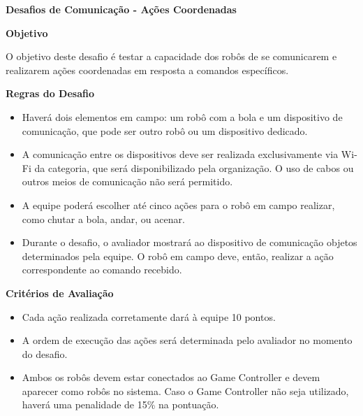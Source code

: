\clearpage
\sffamily
{\bfseries\color[rgb]{0.4,0.4,0.4}Desafios de Comunicação - Ações Coordenadas}
{}

\bigskip

{\bfseries Objetivo}

\headlinebox

O objetivo deste desafio é testar a capacidade dos robôs de se comunicarem e realizarem ações coordenadas em resposta a comandos específicos.

\bigskip

{\bfseries Regras do Desafio}

\headlinebox

\begin{itemize}
	\item Haverá dois elementos em campo: um robô com a bola e um dispositivo de comunicação, que pode ser outro robô ou um dispositivo dedicado.
	\item A comunicação entre os dispositivos deve ser realizada exclusivamente via Wi-Fi da categoria, que será disponibilizado pela organização. O uso de cabos ou outros meios de comunicação não será permitido.
	\item A equipe poderá escolher até cinco ações para o robô em campo realizar, como chutar a bola, andar, ou acenar.
	\item Durante o desafio, o avaliador mostrará ao dispositivo de comunicação objetos determinados pela equipe. O robô em campo deve, então, realizar a ação correspondente ao comando recebido.
\end{itemize}

\bigskip

{\bfseries Critérios de Avaliação}

\headlinebox

\begin{itemize}
	\item Cada ação realizada corretamente dará à equipe 10 pontos.
	\item A ordem de execução das ações será determinada pelo avaliador no momento do desafio.
	\item Ambos os robôs devem estar conectados ao Game Controller e devem aparecer como robôs no sistema. Caso o Game Controller não seja utilizado, haverá uma penalidade de 15\% na pontuação.
\end{itemize}